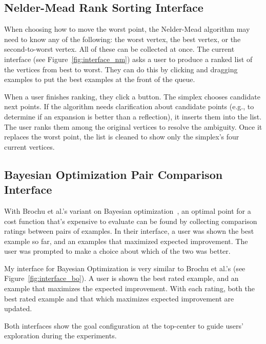 \subsection{Nelder-Mead Rank Sorting Interface}

When choosing how to move the worst point, the Nelder-Mead algorithm may need to know any of the following:
the worst vertex, the best vertex, or the second-to-worst vertex.
All of these can be collected at once.
The current interface (see Figure~\ref{fig:interface_nm}) asks a user to produce a ranked list of the vertices from best to worst.
They can do this by clicking and dragging examples to put the best examples at the front of the queue.

When a user finishes ranking, they click a button.
The simplex chooses candidate next points.
If the algorithm needs clarification about candidate points (e.g., to determine if an expansion is better than a reflection), it inserts them into the list.
The user ranks them among the original vertices to resolve the ambiguity.
Once it replaces the worst point, the list is cleaned to show only the simplex's four current vertices.

\subsection{Bayesian Optimization Pair Comparison Interface}

With Brochu et al.'s variant on Bayesian optimization~\cite{brochu_tutorial_2010}, an optimal point for a cost function that's expensive to evaluate can be found by collecting comparison ratings between pairs of examples.
In their interface, a user was shown the best example so far, and an examples that maximized expected improvement.
The user was prompted to make a choice about which of the two was better.

My interface for Bayesian Optimization is very similar to Brochu et al.'s (see Figure~\ref{fig:interface_bo}).
A user is shown the best rated example, and an example that maximizes the expected improvement.
With each rating, both the best rated example and that which maximizes expected improvement are updated.

Both interfaces show the goal configuration at the top-center to guide users' exploration during the experiments.

